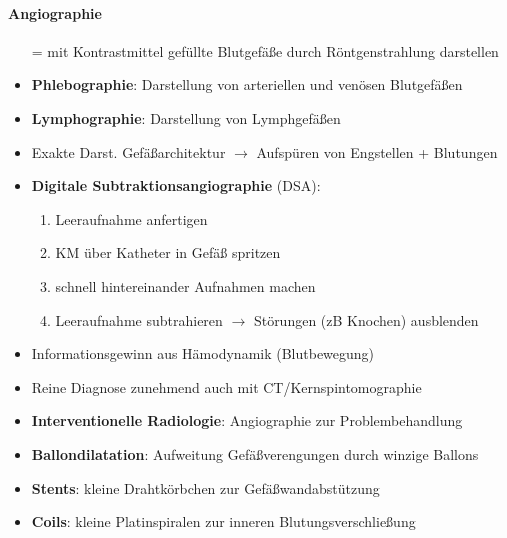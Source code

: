 \paragraph{Angiographie}
\begin{itemize}
  \item[=] mit Kontrastmittel gefüllte Blutgefäße durch Röntgenstrahlung darstellen
  \item \textbf{Phlebographie}: Darstellung von arteriellen und venösen Blutgefäßen
  \item \textbf{Lymphographie}: Darstellung von Lymphgefäßen 
  \item Exakte Darst. Gefäßarchitektur \( \to \) Aufspüren von Engstellen + Blutungen
  \item \textbf{Digitale Subtraktionsangiographie} (DSA):
  \begin{enumerate}
    \item Leeraufnahme anfertigen
    \item KM über Katheter in Gefäß spritzen
    \item schnell hintereinander Aufnahmen machen
    \item Leeraufnahme subtrahieren \( \to \) Störungen (zB Knochen) ausblenden
  \end{enumerate}
  \item Informationsgewinn aus Hämodynamik (Blutbewegung)
  \item Reine Diagnose zunehmend auch mit CT/Kernspintomographie
  \item \textbf{Interventionelle Radiologie}: Angiographie zur Problembehandlung
  \item \textbf{Ballondilatation}: Aufweitung Gefäßverengungen durch winzige Ballons
  \item \textbf{Stents}: kleine Drahtkörbchen zur Gefäßwandabstützung
  \item \textbf{Coils}: kleine Platinspiralen zur inneren Blutungsverschließung
\end{itemize}

